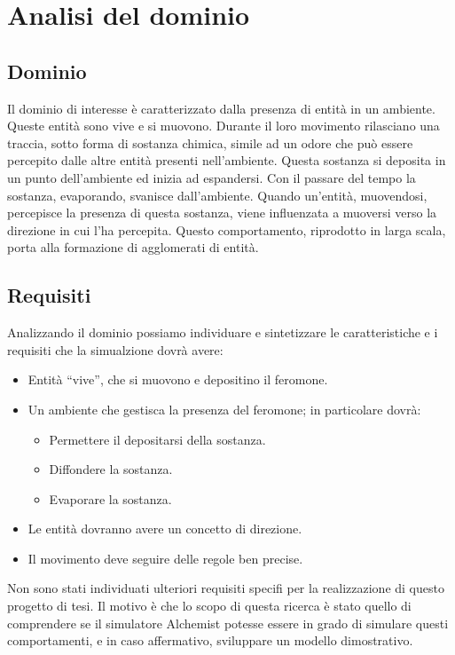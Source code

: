 \chapter{Analisi del dominio}
\section{Dominio}
Il dominio di interesse è caratterizzato dalla presenza di entità in un ambiente.
Queste entità sono vive e si muovono. Durante il loro movimento rilasciano una traccia,
sotto forma di sostanza chimica,
simile ad un odore che può essere percepito dalle altre entità presenti nell'ambiente. Questa sostanza
si deposita in un punto dell'ambiente ed inizia ad espandersi. Con il passare del tempo la sostanza, evaporando, svanisce dall'ambiente.
Quando un'entità, muovendosi, percepisce la presenza di questa sostanza, viene influenzata a muoversi verso la direzione 
in cui l'ha percepita. Questo comportamento, riprodotto in larga scala, porta alla formazione di agglomerati
di entità.
\section{Requisiti}
Analizzando il dominio possiamo individuare e sintetizzare
le caratteristiche e i requisiti che la simualzione dovrà avere:
\begin{itemize}
    \item Entità ``vive'', che si muovono e depositino il feromone.
    \item Un ambiente che gestisca la presenza del feromone; in particolare dovrà:
    \begin{itemize}
        \item Permettere il depositarsi della sostanza.
        \item Diffondere la sostanza.
        \item Evaporare la sostanza.
    \end{itemize}
    \item Le entità dovranno avere un concetto di direzione.
    \item Il movimento deve seguire delle regole ben precise.
\end{itemize}

Non sono stati individuati ulteriori requisiti specifi per la realizzazione di questo progetto di tesi.
Il motivo è che lo scopo di questa ricerca è stato quello di comprendere se il simulatore Alchemist 
potesse essere in grado di simulare questi comportamenti, e in caso affermativo, sviluppare un modello
dimostrativo.
